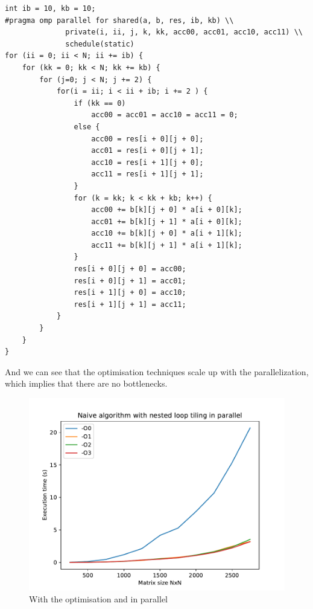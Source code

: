 \documentclass {article}
\begin{document}
\begin{lstlisting}
int ib = 10, kb = 10;
#pragma omp parallel for shared(a, b, res, ib, kb) \\
              private(i, ii, j, k, kk, acc00, acc01, acc10, acc11) \\
              schedule(static)
for (ii = 0; ii < N; ii += ib) {
    for (kk = 0; kk < N; kk += kb) {
        for (j=0; j < N; j += 2) {
            for(i = ii; i < ii + ib; i += 2 ) {
                if (kk == 0)
                    acc00 = acc01 = acc10 = acc11 = 0;
                else {
                    acc00 = res[i + 0][j + 0];
                    acc01 = res[i + 0][j + 1];
                    acc10 = res[i + 1][j + 0];
                    acc11 = res[i + 1][j + 1];
                }
                for (k = kk; k < kk + kb; k++) {
                    acc00 += b[k][j + 0] * a[i + 0][k];
                    acc01 += b[k][j + 1] * a[i + 0][k];
                    acc10 += b[k][j + 0] * a[i + 1][k];
                    acc11 += b[k][j + 1] * a[i + 1][k];
                }
                res[i + 0][j + 0] = acc00;
                res[i + 0][j + 1] = acc01;
                res[i + 1][j + 0] = acc10;
                res[i + 1][j + 1] = acc11;
            }
        }
    }
}
\end{lstlisting}

And we can see that the optimisation techniques scale up with the
parallelization, which implies that there are no bottlenecks.

\begin{figure}[H]
    \includegraphics[width=\linewidth]{plot/with_opt+parallel.pdf}
    \caption{With the optimisation and in parallel}
    \label{fig:with_opt+parallel}
\end{figure}
\end{document}
